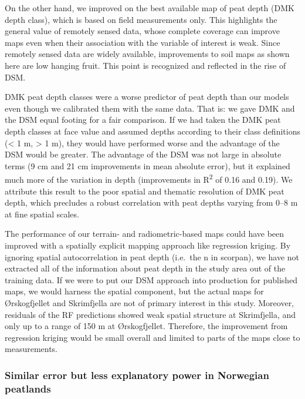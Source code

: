 \documentclass[soil, manuscript]{copernicus}
\begin{document}
On the other hand, we improved on the best available map of peat depth (DMK depth class), which is based on field measurements only.
This highlights the general value of remotely sensed data, whose complete coverage can improve maps even when their association with the variable of interest is weak.
Since remotely sensed data are widely available, improvements to soil maps as shown here are low hanging fruit.
This point is recognized and reflected in the rise of DSM.

DMK peat depth classes were a worse predictor of peat depth than our models even though we calibrated them with the same data.
That is: we gave DMK and the DSM equal footing for a fair comparison.
If we had taken the DMK peat depth classes at face value and assumed depths according to their class definitions (\textless{} 1 m, \textgreater{} 1 m), they would have performed worse and the advantage of the DSM would be greater.
The advantage of the DSM was not large in absolute terms (9 cm and 21 cm improvements in mean absolute error), but it explained much more of the variation in depth (improvements in R\textsuperscript{2} of 0.16 and 0.19).
We attribute this result to the poor spatial and thematic resolution of DMK peat depth, which precludes a robust correlation with peat depths varying from 0--8 m at fine spatial scales.

The performance of our terrain- and radiometric-based maps could have been improved with a spatially explicit mapping approach like regression kriging.
By ignoring spatial autocorrelation in peat depth (i.e.~the n in scorpan), we have not extracted all of the information about peat depth in the study area out of the training data.
If we were to put our DSM approach into production for published maps, we would harness the spatial component, but the actual maps for Ørskogfjellet and Skrimfjella are not of primary interest in this study.
Moreover, residuals of the RF predictions showed weak spatial structure at Skrimfjella, and only up to a range of 150 m at Ørskogfjellet.
Therefore, the improvement from regression kriging would be small overall and limited to parts of the maps close to measurements.

\subsubsection{Similar error but less explanatory power in Norwegian peatlands}
\end{document}
